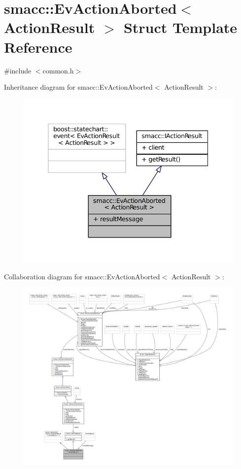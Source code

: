 \hypertarget{structsmacc_1_1EvActionAborted}{}\section{smacc\+:\+:Ev\+Action\+Aborted$<$ Action\+Result $>$ Struct Template Reference}
\label{structsmacc_1_1EvActionAborted}


{\ttfamily \#include $<$common.\+h$>$}



Inheritance diagram for smacc\+:\+:Ev\+Action\+Aborted$<$ Action\+Result $>$\+:
\nopagebreak
\begin{figure}[H]
\begin{center}
\leavevmode
\includegraphics[width=338pt]{structsmacc_1_1EvActionAborted__inherit__graph}
\end{center}
\end{figure}


Collaboration diagram for smacc\+:\+:Ev\+Action\+Aborted$<$ Action\+Result $>$\+:
\nopagebreak
\begin{figure}[H]
\begin{center}
\leavevmode
\includegraphics[width=350pt]{structsmacc_1_1EvActionAborted__coll__graph}
\end{center}
\end{figure}
